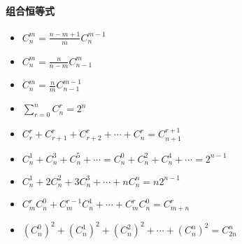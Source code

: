 \paragraph{组合恒等式}
\begin{itemize}
\item $C^{m}_{n} = \frac{n-m+1}{m} C^{m-1}_{n}$
\item $C^{m}_{n} = \frac{n}{n-m} C^{m}_{n-1}$
\item $C^{m}_{n} = \frac{n}{m} C^{m-1}_{n-1}$
\item $\sum^n_{r=0} C^{r}_{n} = 2^n$
\item $C^{r}_{r} + C^{r}_{r+1} + C^{r}_{r+2} + \cdots + C^{r}_{n} = C^{r+1}_{n+1}$
\item $C^{1}_{n} + C^{3}_{n} + C^{5}_{n} + \cdots = C^{0}_{n} + C^{2}_{n} + C^{4}_{n} + \cdots = 2^{n-1}$
\item $C^{1}_{n} + 2C^{2}_{n} + 3C^{3}_{n} + \cdots + nC^{n}_{n} = n2^{n-1}$
\item $C^{r}_{m}C^{0}_{n} + C^{r-1}_{m}C^{1}_{n} + \cdots + C^{r}_{m}C^{0}_{n} = C^{r}_{m+n}$
\item $(C^{0}_{n})^2 + (C^{1}_{n})^2 + (C^{2}_{n})^2 + \cdots + (C^{n}_{n})^2 = C^{n}_{2n}$
\end{itemize}
